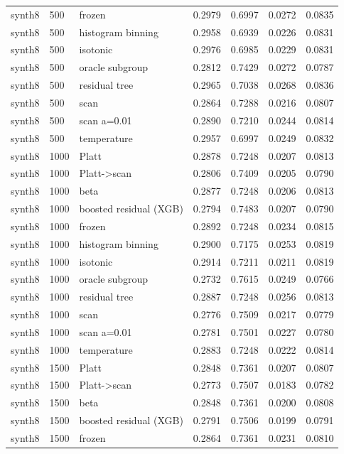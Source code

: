 \begin{tabular}{lllrrrr}
synth8 & 500 & frozen & 0.2979 & 0.6997 & 0.0272 & 0.0835 \\
synth8 & 500 & histogram binning & 0.2958 & 0.6939 & 0.0226 & 0.0831 \\
synth8 & 500 & isotonic & 0.2976 & 0.6985 & 0.0229 & 0.0831 \\
synth8 & 500 & oracle subgroup & 0.2812 & 0.7429 & 0.0272 & 0.0787 \\
synth8 & 500 & residual tree & 0.2965 & 0.7038 & 0.0268 & 0.0836 \\
synth8 & 500 & scan & 0.2864 & 0.7288 & 0.0216 & 0.0807 \\
synth8 & 500 & scan a=0.01 & 0.2890 & 0.7210 & 0.0244 & 0.0814 \\
synth8 & 500 & temperature & 0.2957 & 0.6997 & 0.0249 & 0.0832 \\
synth8 & 1000 & Platt & 0.2878 & 0.7248 & 0.0207 & 0.0813 \\
synth8 & 1000 & Platt->scan & 0.2806 & 0.7409 & 0.0205 & 0.0790 \\
synth8 & 1000 & beta & 0.2877 & 0.7248 & 0.0206 & 0.0813 \\
synth8 & 1000 & boosted residual (XGB) & 0.2794 & 0.7483 & 0.0207 & 0.0790 \\
synth8 & 1000 & frozen & 0.2892 & 0.7248 & 0.0234 & 0.0815 \\
synth8 & 1000 & histogram binning & 0.2900 & 0.7175 & 0.0253 & 0.0819 \\
synth8 & 1000 & isotonic & 0.2914 & 0.7211 & 0.0211 & 0.0819 \\
synth8 & 1000 & oracle subgroup & 0.2732 & 0.7615 & 0.0249 & 0.0766 \\
synth8 & 1000 & residual tree & 0.2887 & 0.7248 & 0.0256 & 0.0813 \\
synth8 & 1000 & scan & 0.2776 & 0.7509 & 0.0217 & 0.0779 \\
synth8 & 1000 & scan a=0.01 & 0.2781 & 0.7501 & 0.0227 & 0.0780 \\
synth8 & 1000 & temperature & 0.2883 & 0.7248 & 0.0222 & 0.0814 \\
synth8 & 1500 & Platt & 0.2848 & 0.7361 & 0.0207 & 0.0807 \\
synth8 & 1500 & Platt->scan & 0.2773 & 0.7507 & 0.0183 & 0.0782 \\
synth8 & 1500 & beta & 0.2848 & 0.7361 & 0.0200 & 0.0808 \\
synth8 & 1500 & boosted residual (XGB) & 0.2791 & 0.7506 & 0.0199 & 0.0791 \\
synth8 & 1500 & frozen & 0.2864 & 0.7361 & 0.0231 & 0.0810 \\

\end{tabular}
